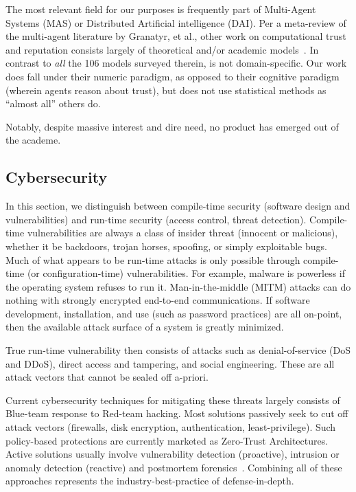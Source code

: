 The most relevant field for our purposes is frequently part of Multi-Agent Systems (MAS) or Distributed Artificial intelligence (DAI).
Per a meta-review of the multi-agent literature by Granatyr, et al., other work on computational trust and reputation consists largely of theoretical and/or academic models~\cite{granatyr2015trust}.
In contrast to \emph{all} the 106 models surveyed therein, \projectName is not domain-specific.
Our work does fall under their numeric paradigm, as opposed to their cognitive paradigm (wherein agents reason about trust), but does not use statistical methods as ``almost all'' others do.

Notably, despite massive interest and dire need, no product has emerged out of the academe.


\subsection{Cybersecurity}\label{subsec:cyber}

In this section, we distinguish between compile-time security (software design and vulnerabilities) and run-time security (access control, threat detection).
Compile-time vulnerabilities are always a class of insider threat (innocent or malicious), whether it be backdoors, trojan horses, spoofing, or simply exploitable bugs.
Much of what appears to be run-time attacks is only possible through compile-time (or configuration-time) vulnerabilities.
For example, malware is powerless if the operating system refuses to run it.
Man-in-the-middle (MITM) attacks can do nothing with strongly encrypted end-to-end communications.
If software development, installation, and use (such as password practices) are all on-point, then the available attack surface of a system is greatly minimized.

True run-time vulnerability then consists of attacks such as denial-of-service (DoS and DDoS), direct access and tampering, and social engineering.
These are all attack vectors that cannot be sealed off a-priori.

Current cybersecurity techniques for mitigating these threats largely consists of Blue-team response to Red-team hacking.
Most solutions passively seek to cut off attack vectors (firewalls, disk encryption, authentication, least-privilege).
Such policy-based protections are currently marketed as Zero-Trust Architectures.
Active solutions usually involve vulnerability detection (proactive), intrusion or anomaly detection (reactive) and postmortem forensics~\cite{anderson2020security, brooks2018cybersecurity, wittkop2022cybersecurity}.
Combining all of these approaches represents the industry-best-practice of defense-in-depth.